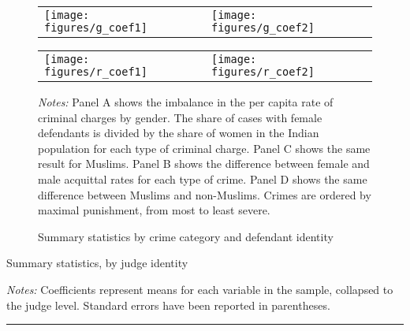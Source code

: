 \documentclass[12pt,english]{article}
\begin{document}
    \begin{sidewaysfigure}
      \centering
      \caption{Summary statistics by
        crime category and defendant identity}
      \label{fig:summary}
            \begin{tabular}{@{}ll@{}}
        \texttt{[image: figures/g\_coef1]} &
        \texttt{[image: figures/g\_coef2]} \\
      \end{tabular}
      \begin{tabular}{@{}ll@{}}
        \texttt{[image: figures/r\_coef1]} &
        \texttt{[image: figures/r\_coef2]} \\
      \end{tabular}
      
  \begin{minipage}{1.0\textwidth}
    {\scriptsize \emph{Notes:}       Panel A shows the imbalance in the per capita rate of criminal charges by gender.  The share of cases with female defendants is divided by the share of women in the Indian population for each type of criminal charge. Panel C shows the same result for Muslims. Panel B shows the difference between female and male acquittal rates for each type of crime. Panel D shows the same difference between Muslims and non-Muslims. Crimes are ordered by maximal punishment, from most to least severe.


 \par}
   \end{minipage}
  \end{sidewaysfigure}


  \begin{table}[ht]
    \begin{center}
      \caption{Summary statistics, by judge identity}
      \label{tab:judge_sam}
     
    \begin{minipage}{0.95\textwidth}
    {\footnotesize \vspace{1mm}\emph{Notes:} Coefficients represent means for each variable in the sample, collapsed to the judge level. Standard errors have been reported in parentheses. \par} \vspace{1mm} 
    \hrule
   \end{minipage}
    \end{center}
  \end{table}
\end{document}
